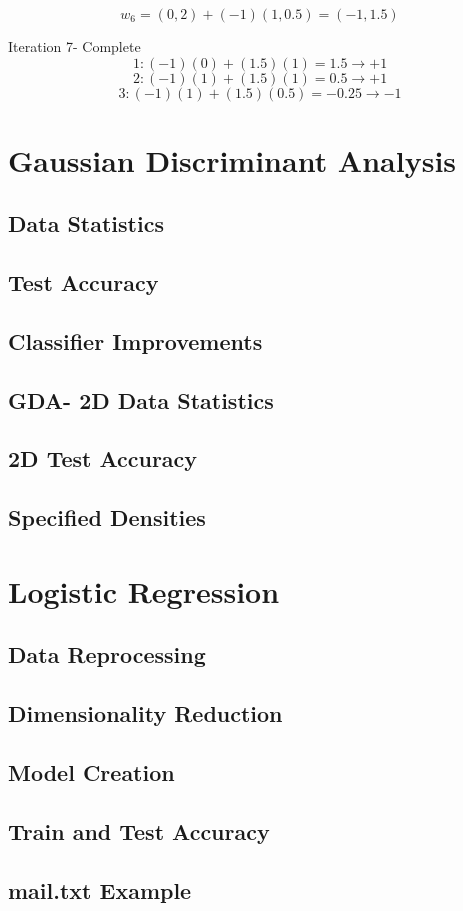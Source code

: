 \documentclass{article}
\begin{document}
\[w_6 = (0,2) + (-1)(1, 0.5) = (-1,1.5)\]

Iteration 7- Complete
\[1: (-1)(0) + (1.5)(1) = 1.5 \rightarrow +1\]
\[2: (-1)(1) + (1.5)(1) = 0.5 \rightarrow +1\]
\[3: (-1)(1) + (1.5)(0.5) = -0.25 \rightarrow -1\]

\section{Gaussian Discriminant Analysis}
\subsection{Data Statistics}
\subsection{Test Accuracy}
\subsection{Classifier Improvements}
\subsection{GDA- 2D Data Statistics}
\subsection{2D Test Accuracy}
\subsection{Specified Densities}

\section{Logistic Regression}
\subsection{Data Reprocessing}
\subsection{Dimensionality Reduction}
\subsection{Model Creation}
\subsection{Train and Test Accuracy}
\subsection{mail.txt Example}
\end{document}
